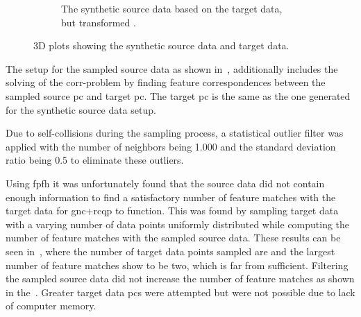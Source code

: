 \begin{figure}[!h]
\begin{subfigure}[b]{0.48\textwidth}
		\caption{The synthetic source data based on the target data, but transformed .}
		\label{fig:synthetic-target-data}
	\end{subfigure}
	\caption{3D plots showing the synthetic source data and target data.}
	\label{fig:synthetic-source-and-target-data}
\end{figure}


The setup for the sampled source data as shown in~, additionally includes the solving of the \gls{corr-problem} by finding feature correspondences between the sampled source \gls{pc} and target \gls{pc}. The target \gls{pc} is the same as the one generated for the synthetic source data setup. \medskip 

Due to self-collisions during the sampling process, a statistical outlier filter was applied with the number of neighbors  being \num{1,000} and the standard deviation ratio \mvar{\sigma} being \num{0.5} to eliminate these outliers.\medskip

Using \gls{fpfh} it was unfortunately found that the source data did not contain enough information to find a satisfactory number of feature matches with the target data for \gls{gnc}+\gls{rcqp} to function. This was found by sampling target data with a varying number of data points uniformly distributed while computing the number of feature matches with the sampled source data. These results can be seen in~, where the number of target data points sampled are  and the largest number of feature matches show to be two, which is far from sufficient. Filtering the sampled source data did not increase the number of feature matches as shown in the~. Greater target data \gls{pc}s were attempted but were not possible due to lack of computer memory.


